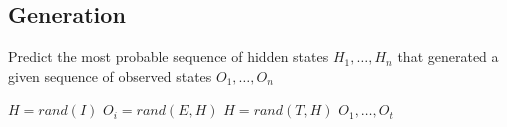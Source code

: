 \documentclass[../main.tex]{subfiles}
\begin{document}
\subsection{Generation}
\begin{algorithm}[H]
\caption{Predict the most probable sequence of hidden states $H_1, \ldots, H_n$ that generated a given sequence of observed states $O_1, \ldots, O_n$}
\label{hmm-predict}
\begin{algorithmic}
    \State $H = rand(I)$
        \State $O_i = rand(E, H)$
        \State $H = rand(T, H)$
    \EndFor
    \State\Return $O_1, \ldots, O_t$
\EndFunction
\end{algorithmic}
\end{algorithm}
\end{document}
